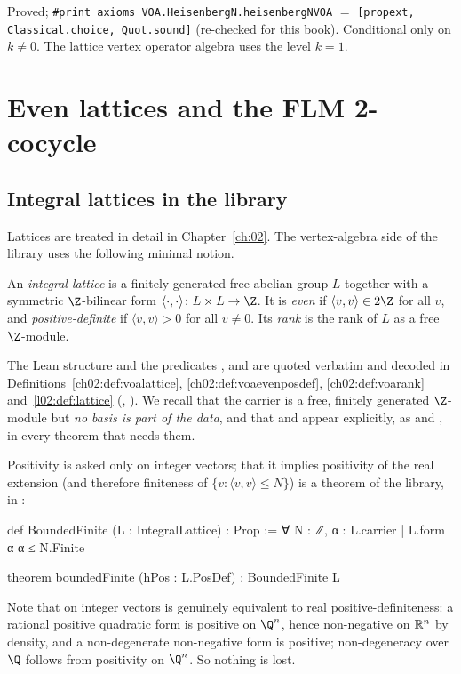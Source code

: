 \begin{status}
Proved; \texttt{\#print axioms VOA.HeisenbergN.heisenbergNVOA} $=$
\texttt{[propext, Classical.choice, Quot.sound]} (re-checked for this book). Conditional only on
$k\neq 0$. The lattice vertex operator algebra uses the level $k=1$.
\end{status}

\section{Even lattices and the FLM 2-cocycle}\label{ch03:sec:cocycle}

\subsection{Integral lattices in the library}

Lattices are treated in detail in Chapter~\ref{ch:02}. The vertex-algebra side of the library uses
the following minimal notion.

\begin{definition}\label{ch03:def:lattice}
An \emph{integral lattice} is a finitely generated free abelian group $L$ together with a
symmetric $\Z$-bilinear form $\langle\cdot,\cdot\rangle\colon L\times L\to\Z$. It is \emph{even}
if $\langle v,v\rangle\in2\Z$ for all $v$, and \emph{positive-definite} if
$\langle v,v\rangle>0$ for all $v\ne0$. Its \emph{rank} is the rank of $L$ as a free
$\Z$-module.
\end{definition}

The Lean structure  and the predicates ,  and
 are quoted verbatim and decoded in Definitions~\ref{ch02:def:voalattice},
\ref{ch02:def:voaevenposdef}, \ref{ch02:def:voarank} and~\ref{l02:def:lattice}
(, ). We
recall that the carrier is a free, finitely generated $\Z$-module but \emph{no basis is part of the
data}, and that  and  appear explicitly, as  and ,
in every theorem that needs them.

\begin{dictionary}
Positivity is asked only on integer vectors; that it implies positivity of the real extension
(and therefore finiteness of $\{v:\langle v,v\rangle\le N\}$) is a theorem of the library,
 in :
\begin{leancode}
def BoundedFinite (L : IntegralLattice) : Prop :=
  ∀ N : ℤ, {α : L.carrier | L.form α α ≤ N}.Finite

theorem boundedFinite (hPos : L.PosDef) : BoundedFinite L
\end{leancode}
Note that  on integer vectors is genuinely equivalent to real positive-definiteness:
a rational positive quadratic form is positive on $\Q^n$, hence non-negative on $\mathbb{R}^n$ by
density, and a non-degenerate non-negative form is positive; non-degeneracy over $\Q$ follows from
positivity on $\Q^n$. So nothing is lost.
\end{dictionary}

